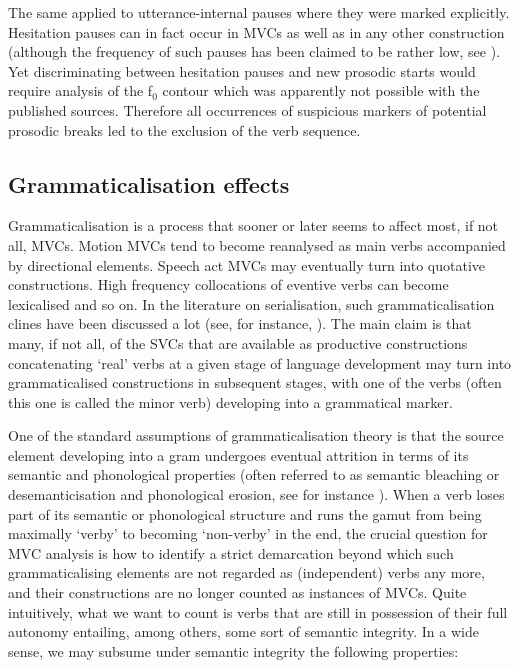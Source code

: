 The same applied to utterance-internal pauses where they were marked explicitly. Hesitation pauses can in fact occur in MVCs as well as in any other construction (although the frequency of such pauses has been claimed to be rather low, see \citealt{givon1991serial}). Yet discriminating between hesitation pauses and new prosodic starts would require analysis of the f$_0$ contour which was apparently not possible with the published sources. Therefore all occurrences of suspicious markers of potential prosodic breaks led to the exclusion of the verb sequence.

\subsection{Grammaticalisation effects} \label{sec:grammaticalisation}

Grammaticalisation is a process that sooner or later seems to affect most, if not all, MVCs. Motion MVCs tend to become reanalysed as main verbs accompanied by directional elements. Speech act MVCs may eventually turn into quotative constructions. High frequency collocations of eventive verbs can become lexicalised and so on. In the literature on serialisation, such grammaticalisation clines have been discussed a lot (see, for instance, \citealt{lord1993historical, crowley2002serial, bowern2008diachrony}). The main claim is that many, if not all, of the SVCs that are available as productive constructions concatenating `real' verbs at a given stage of language development may turn into grammaticalised constructions in subsequent stages, with one of the verbs (often this one is called the minor verb) developing into a grammatical marker. 

One of the standard assumptions of grammaticalisation theory is that the source element developing into a gram undergoes eventual attrition in terms of its semantic and phonological properties (often referred to as semantic bleaching or desemanticisation and phonological erosion, see for instance \citealt{lehmann2002thoughts}). When a verb loses part of its semantic or phonological structure and runs the gamut from being maximally `verby’ to becoming `non-verby’ in the end, the crucial question for MVC analysis is how to identify a strict demarcation beyond which such grammaticalising elements are not regarded as (independent) verbs any more, and their constructions are no longer counted as instances of MVCs. Quite intuitively, what we want to count is verbs that are still in possession of their full autonomy entailing, among others, some sort of semantic integrity. In a wide sense, we may subsume under semantic integrity the following properties:

